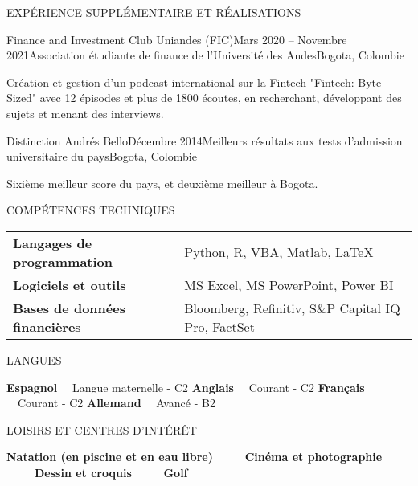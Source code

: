 \documentclass{resume} %
\begin{document}
%
%

\begin{rSection}{EXPÉRIENCE SUPPLÉMENTAIRE ET RÉALISATIONS}

\begin{rSubsection}{Finance and Investment Club Uniandes (FIC)}{Mars 2020 – Novembre 2021}{Association étudiante de finance de l'Université des Andes}{Bogota, Colombie}
    \item Création et gestion d'un podcast international sur la Fintech "Fintech: Byte-Sized" avec 12 épisodes et plus de 1800 écoutes, en recherchant, développant des sujets et menant des interviews.
\end{rSubsection}

\begin{rSubsection}{Distinction Andrés Bello}{Décembre 2014}{Meilleurs résultats aux tests d'admission universitaire du pays}{Bogota, Colombie}
    \item Sixième meilleur score du pays, et deuxième meilleur à Bogota.
\end{rSubsection}

\end{rSection}

%
%

\begin{rSection}{COMPÉTENCES TECHNIQUES}

\begin{tabular}{ @{} >{\bfseries}l @{\hspace{6ex}} l }
Langages de programmation &  Python, R, VBA, Matlab, \LaTeX\\
Logiciels et outils & MS Excel, MS PowerPoint, Power BI \\
Bases de données financières & Bloomberg, Refinitiv, S\&P Capital IQ Pro, FactSet \\
\end{tabular}

\end{rSection}


%
%

\begin{rSection}{LANGUES}

{\bf Espagnol} \ \ {Langue maternelle - C2} \hfill {\bf Anglais} \ \ {Courant - C2} \hfill {\bf Français} \ \ {Courant - C2} \hfill {\bf Allemand} \ \ {Avancé - B2}

\end{rSection}

%
%

\begin{rSection}{LOISIRS ET CENTRES D’INTÉRÊT}

    {\bf Natation (en piscine et en eau libre)} \ \ \ \ \ {\bf Cinéma et photographie} \ \ \ \ \ {\bf Dessin et croquis} \ \ \ \ \ {\bf Golf}
    
\end{rSection}
\end{document}
